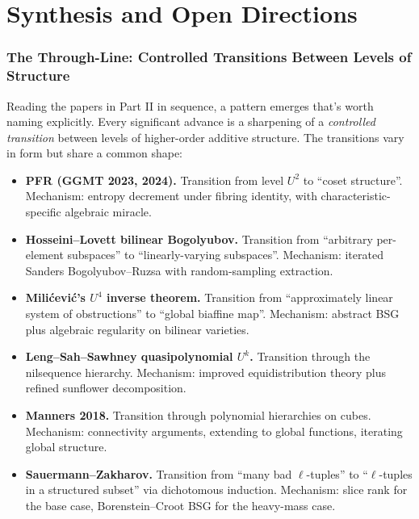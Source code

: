 \documentclass[11pt,a4paper]{article}
\theoremstyle{plain}
\theoremstyle{definition}
\theoremstyle{remark}
\begin{document}
\newpage

\part{Synthesis and Open Directions}

\section{The Through-Line: Controlled Transitions Between Levels of Structure}

Reading the papers in Part II in sequence, a pattern emerges that's worth naming explicitly. Every significant advance is a sharpening of a \emph{controlled transition} between levels of higher-order additive structure. The transitions vary in form but share a common shape:

\begin{itemize}[leftmargin=2em]
  \item \textbf{PFR (GGMT 2023, 2024).} Transition from level $U^2$ to ``coset structure''. Mechanism: entropy decrement under fibring identity, with characteristic-specific algebraic miracle.
  \item \textbf{Hosseini--Lovett bilinear Bogolyubov.} Transition from ``arbitrary per-element subspaces'' to ``linearly-varying subspaces''. Mechanism: iterated Sanders Bogolyubov--Ruzsa with random-sampling extraction.
  \item \textbf{Milićević's $U^4$ inverse theorem.} Transition from ``approximately linear system of obstructions'' to ``global biaffine map''. Mechanism: abstract BSG plus algebraic regularity on bilinear varieties.
  \item \textbf{Leng--Sah--Sawhney quasipolynomial $U^k$.} Transition through the nilsequence hierarchy. Mechanism: improved equidistribution theory plus refined sunflower decomposition.
  \item \textbf{Manners 2018.} Transition through polynomial hierarchies on cubes. Mechanism: connectivity arguments, extending to global functions, iterating global structure.
  \item \textbf{Sauermann--Zakharov.} Transition from ``many bad $\ell$-tuples'' to ``$\ell$-tuples in a structured subset'' via dichotomous induction. Mechanism: slice rank for the base case, Borenstein--Croot BSG for the heavy-mass case.
\end{itemize}
\end{document}
